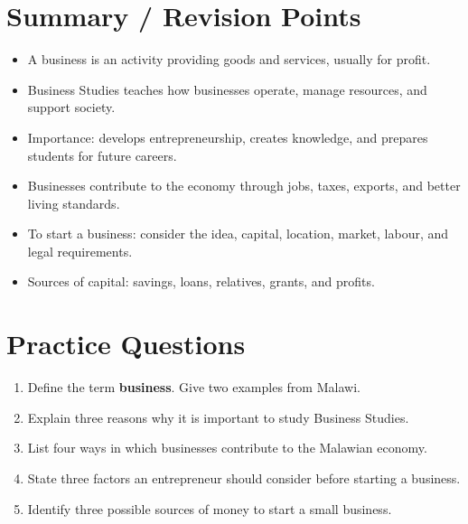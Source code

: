 \documentclass[12pt,a4paper, openany]{book}
\begin{document}
\section{Summary / Revision Points}
\begin{itemize}
	\item A business is an activity providing goods and services, usually for profit.
	\item Business Studies teaches how businesses operate, manage resources, and support society.
	\item Importance: develops entrepreneurship, creates knowledge, and prepares students for future careers.
	\item Businesses contribute to the economy through jobs, taxes, exports, and better living standards.
	\item To start a business: consider the idea, capital, location, market, labour, and legal requirements.
	\item Sources of capital: savings, loans, relatives, grants, and profits.
\end{itemize}

\section*{Practice Questions}
\begin{enumerate}
	\item Define the term \textbf{business}. Give two examples from Malawi.
	\item Explain three reasons why it is important to study Business Studies.
	\item List four ways in which businesses contribute to the Malawian economy.
	\item State three factors an entrepreneur should consider before starting a business.
	\item Identify three possible sources of money to start a small business.
\end{enumerate}
\end{document}
